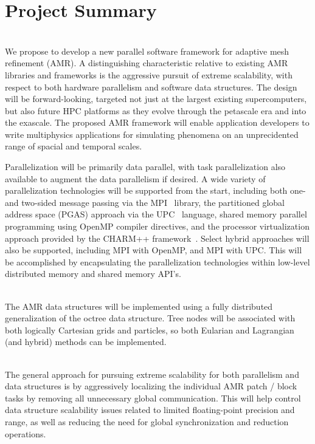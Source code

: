 \documentclass[14pt,letter]{article}
\begin{document}
\section{Project Summary}  \label{s:summary}


\ \\  
%
We propose to develop a new parallel software framework for adaptive
mesh refinement (AMR).  
%
A distinguishing characteristic relative to existing AMR libraries and
frameworks is the aggressive pursuit of extreme scalability, with
respect to both hardware parallelism and software data structures.
%
The design will be forward-looking, targeted not just at the largest
existing supercomputers, but also future HPC platforms as they evolve
through the petascale era and into the exascale.
%
The proposed AMR framework will enable application developers to
write multiphysics applications for simulating phenomena on an
unprecidented range of spacial and temporal scales.


Parallelization will be primarily data parallel, with task
parallelization also available to augment the data parallelism if
desired.  A wide variety of parallelization technologies will be
supported from the start, including both one- and two-sided message
passing via the MPI~\cite{@@@MPI} library, the partitioned global
address space (PGAS) approach via the UPC~\cite{@@@UPC} language,
shared memory parallel programming using OpenMP compiler directives,
and the processor virtualization approach provided by the CHARM++
framework~\cite{@@@CHARM}.  Select hybrid approaches will also be
supported, including MPI with OpenMP, and MPI with UPC.  This will be
accomplished by encapsulating the parallelization technologies within
low-level distributed memory and shared memory API's.


\ \\ 
%
The AMR data structures will be implemented using a fully distributed
generalization of the octree data structure.  Tree nodes will be
associated with both logically Cartesian grids and particles, so both
Eularian and Lagrangian (and hybrid) methods can be implemented.

\ \\  The general approach for pursuing
extreme scalability for both parallelism and data structures is by
aggressively localizing the individual AMR patch / block tasks by removing
all unnecessary global communication.  This
will help control data structure scalability issues related to limited
floating-point precision and range, as well as reducing the need for
global synchronization and reduction operations.
\end{document}
